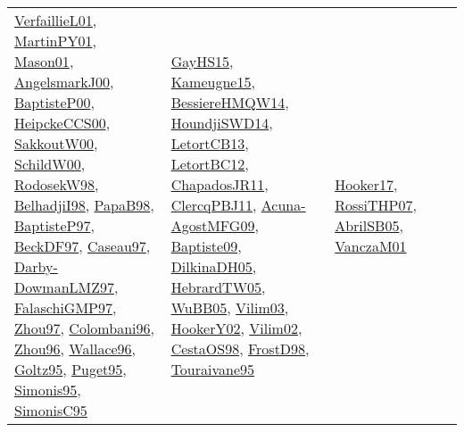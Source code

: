 {\begin{longtable}{llp{6cm}p{6cm}p{6cm}}
\href{papers/VerfaillieL01.pdf}{VerfaillieL01}\cite{VerfaillieL01}, \href{articles/MartinPY01.pdf}{MartinPY01}\cite{MartinPY01}, \href{articles/Mason01.pdf}{Mason01}\cite{Mason01}, \href{papers/AngelsmarkJ00.pdf}{AngelsmarkJ00}\cite{AngelsmarkJ00}, \href{articles/BaptisteP00.pdf}{BaptisteP00}\cite{BaptisteP00}, \href{articles/HeipckeCCS00.pdf}{HeipckeCCS00}\cite{HeipckeCCS00}, \href{articles/SakkoutW00.pdf}{SakkoutW00}\cite{SakkoutW00}, \href{articles/SchildW00.pdf}{SchildW00}\cite{SchildW00}, \href{papers/RodosekW98.pdf}{RodosekW98}\cite{RodosekW98}, \href{articles/BelhadjiI98.pdf}{BelhadjiI98}\cite{BelhadjiI98}, \href{articles/PapaB98.pdf}{PapaB98}\cite{PapaB98}, \href{papers/BaptisteP97.pdf}{BaptisteP97}\cite{BaptisteP97}, \href{papers/BeckDF97.pdf}{BeckDF97}\cite{BeckDF97}, \href{papers/Caseau97.pdf}{Caseau97}\cite{Caseau97}, \href{articles/Darby-DowmanLMZ97.pdf}{Darby-DowmanLMZ97}\cite{Darby-DowmanLMZ97}, \href{articles/FalaschiGMP97.pdf}{FalaschiGMP97}\cite{FalaschiGMP97}, \href{articles/Zhou97.pdf}{Zhou97}\cite{Zhou97}, \href{papers/Colombani96.pdf}{Colombani96}\cite{Colombani96}, \href{papers/Zhou96.pdf}{Zhou96}\cite{Zhou96}, \href{articles/Wallace96.pdf}{Wallace96}\cite{Wallace96}, \href{papers/Goltz95.pdf}{Goltz95}\cite{Goltz95}, \href{papers/Puget95.pdf}{Puget95}\cite{Puget95}, \href{papers/Simonis95.pdf}{Simonis95}\cite{Simonis95}, \href{papers/SimonisC95.pdf}{SimonisC95}\cite{SimonisC95} & \href{papers/GayHS15.pdf}{GayHS15}\cite{GayHS15}, \href{articles/Kameugne15.pdf}{Kameugne15}\cite{Kameugne15}, \href{papers/BessiereHMQW14.pdf}{BessiereHMQW14}\cite{BessiereHMQW14}, \href{papers/HoundjiSWD14.pdf}{HoundjiSWD14}\cite{HoundjiSWD14}, \href{papers/LetortCB13.pdf}{LetortCB13}\cite{LetortCB13}, \href{papers/LetortBC12.pdf}{LetortBC12}\cite{LetortBC12}, \href{papers/ChapadosJR11.pdf}{ChapadosJR11}\cite{ChapadosJR11}, \href{papers/ClercqPBJ11.pdf}{ClercqPBJ11}\cite{ClercqPBJ11}, \href{papers/Acuna-AgostMFG09.pdf}{Acuna-AgostMFG09}\cite{Acuna-AgostMFG09}, \href{papers/Baptiste09.pdf}{Baptiste09}\cite{Baptiste09}, \href{papers/DilkinaDH05.pdf}{DilkinaDH05}\cite{DilkinaDH05}, \href{papers/HebrardTW05.pdf}{HebrardTW05}\cite{HebrardTW05}, \href{papers/WuBB05.pdf}{WuBB05}\cite{WuBB05}, \href{papers/Vilim03.pdf}{Vilim03}\cite{Vilim03}, \href{papers/HookerY02.pdf}{HookerY02}\cite{HookerY02}, \href{papers/Vilim02.pdf}{Vilim02}\cite{Vilim02}, \href{papers/CestaOS98.pdf}{CestaOS98}\cite{CestaOS98}, \href{papers/FrostD98.pdf}{FrostD98}\cite{FrostD98}, \href{papers/Touraivane95.pdf}{Touraivane95}\cite{Touraivane95} & \href{papers/Hooker17.pdf}{Hooker17}\cite{Hooker17}, \href{papers/RossiTHP07.pdf}{RossiTHP07}\cite{RossiTHP07}, \href{papers/AbrilSB05.pdf}{AbrilSB05}\cite{AbrilSB05}, \href{papers/VanczaM01.pdf}{VanczaM01}\cite{VanczaM01}\\

\end{longtable}}
